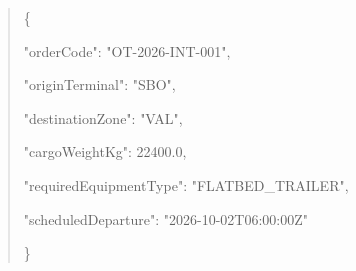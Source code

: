 \begin{quote}\ttfamily
  \{\allowbreak{}\par
    "\allowbreak{}o\allowbreak{}r\allowbreak{}d\allowbreak{}e\allowbreak{}r\allowbreak{}C\allowbreak{}o\allowbreak{}d\allowbreak{}e\allowbreak{}"\allowbreak{}:\allowbreak{} "\allowbreak{}O\allowbreak{}T\allowbreak{}-\allowbreak{}2\allowbreak{}0\allowbreak{}2\allowbreak{}6\allowbreak{}-\allowbreak{}I\allowbreak{}N\allowbreak{}T\allowbreak{}-\allowbreak{}0\allowbreak{}0\allowbreak{}1\allowbreak{}"\allowbreak{},\allowbreak{}\par
    "\allowbreak{}o\allowbreak{}r\allowbreak{}i\allowbreak{}g\allowbreak{}i\allowbreak{}n\allowbreak{}T\allowbreak{}e\allowbreak{}r\allowbreak{}m\allowbreak{}i\allowbreak{}n\allowbreak{}a\allowbreak{}l\allowbreak{}"\allowbreak{}:\allowbreak{} "\allowbreak{}S\allowbreak{}B\allowbreak{}O\allowbreak{}"\allowbreak{},\allowbreak{}\par
    "\allowbreak{}d\allowbreak{}e\allowbreak{}s\allowbreak{}t\allowbreak{}i\allowbreak{}n\allowbreak{}a\allowbreak{}t\allowbreak{}i\allowbreak{}o\allowbreak{}n\allowbreak{}Z\allowbreak{}o\allowbreak{}n\allowbreak{}e\allowbreak{}"\allowbreak{}:\allowbreak{} "\allowbreak{}V\allowbreak{}A\allowbreak{}L\allowbreak{}"\allowbreak{},\allowbreak{}\par
    "\allowbreak{}c\allowbreak{}a\allowbreak{}r\allowbreak{}g\allowbreak{}o\allowbreak{}W\allowbreak{}e\allowbreak{}i\allowbreak{}g\allowbreak{}h\allowbreak{}t\allowbreak{}K\allowbreak{}g\allowbreak{}"\allowbreak{}:\allowbreak{} 2\allowbreak{}2\allowbreak{}4\allowbreak{}0\allowbreak{}0\allowbreak{}.\allowbreak{}0\allowbreak{},\allowbreak{}\par
    "\allowbreak{}r\allowbreak{}e\allowbreak{}q\allowbreak{}u\allowbreak{}i\allowbreak{}r\allowbreak{}e\allowbreak{}d\allowbreak{}E\allowbreak{}q\allowbreak{}u\allowbreak{}i\allowbreak{}p\allowbreak{}m\allowbreak{}e\allowbreak{}n\allowbreak{}t\allowbreak{}T\allowbreak{}y\allowbreak{}p\allowbreak{}e\allowbreak{}"\allowbreak{}:\allowbreak{} "\allowbreak{}F\allowbreak{}L\allowbreak{}A\allowbreak{}T\allowbreak{}B\allowbreak{}E\allowbreak{}D\allowbreak{}\_\allowbreak{}T\allowbreak{}R\allowbreak{}A\allowbreak{}I\allowbreak{}L\allowbreak{}E\allowbreak{}R\allowbreak{}"\allowbreak{},\allowbreak{}\par
    "\allowbreak{}s\allowbreak{}c\allowbreak{}h\allowbreak{}e\allowbreak{}d\allowbreak{}u\allowbreak{}l\allowbreak{}e\allowbreak{}d\allowbreak{}D\allowbreak{}e\allowbreak{}p\allowbreak{}a\allowbreak{}r\allowbreak{}t\allowbreak{}u\allowbreak{}r\allowbreak{}e\allowbreak{}"\allowbreak{}:\allowbreak{} "\allowbreak{}2\allowbreak{}0\allowbreak{}2\allowbreak{}6\allowbreak{}-\allowbreak{}1\allowbreak{}0\allowbreak{}-\allowbreak{}0\allowbreak{}2\allowbreak{}T\allowbreak{}0\allowbreak{}6\allowbreak{}:\allowbreak{}0\allowbreak{}0\allowbreak{}:\allowbreak{}0\allowbreak{}0\allowbreak{}Z\allowbreak{}"\allowbreak{}\par
  \}\allowbreak{}\par
\end{quote}
